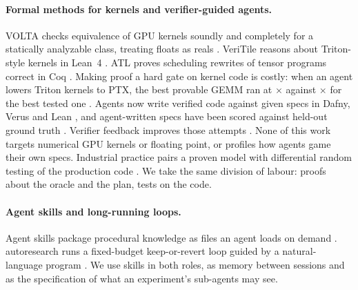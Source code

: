 \paragraph{Formal methods for kernels and verifier-guided agents.}
VOLTA checks equivalence of GPU kernels soundly and completely for a statically
analyzable class, treating floats as reals \citep{dubey2025volta}. VeriTile reasons about
Triton-style kernels in Lean~4 \citep{veritile2026,demoura2021lean4}. ATL proves scheduling
rewrites of tensor programs correct in Coq \citep{liu2022atl}. Making proof a hard gate
on kernel code is costly: when an agent lowers Triton kernels to PTX, the best provable
GEMM ran at \provableGemm$\times$ against \testedGemm$\times$ for the best tested one
\citep{costa2026aicompiler}. Agents now write verified code against given specs in Dafny,
Verus and Lean \citep{loughridge2024dafnybench,bursuc2025vericoding}, and agent-written
specs have been scored against held-out ground truth
\citep{ye2025verina,thakur2025clever}. Verifier feedback improves those attempts
\citep{aggarwal2025alphaverus}. None of this work targets numerical GPU kernels or
floating point, or profiles how agents game their own specs. Industrial practice pairs a
proven model with differential random testing of the production code
\citep{disselkoen2024cedar}. We take the same division of labour: proofs about the oracle
and the plan, tests on the code.

\paragraph{Agent skills and long-running loops.}
Agent skills package procedural knowledge as files an agent loads on demand
\citep{anthropic2025skills}. autoresearch runs a fixed-budget keep-or-revert loop guided
by a natural-language program \citep{karpathy2026autoresearch}. We use skills in both
roles, as memory between sessions and as the specification of what an experiment's
sub-agents may see.
